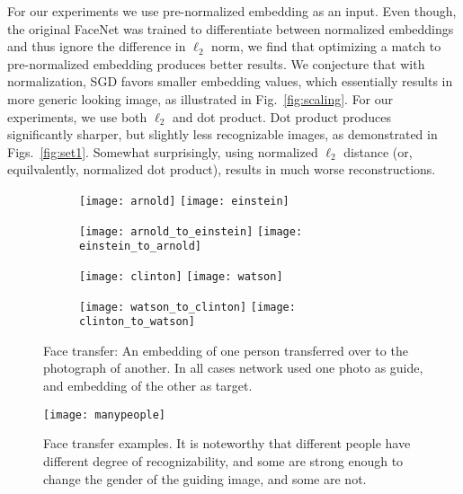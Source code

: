 \documentclass{article}
\newcommand{\Fig}[1]{Fig.~\ref{#1}}
\newcommand{\Figs}[1]{Figs.~\ref{#1}}
\begin{document}
  For our experiments we use pre-normalized embedding as an input. Even though, the original FaceNet was trained to differentiate between normalized embeddings and thus ignore
  the difference in $\ell_2$ norm, we find that optimizing a match to pre-normalized embedding produces better results. We conjecture that with normalization, SGD favors smaller embedding values, which
  essentially results in more generic looking image, as illustrated in \Fig{fig:scaling}.
  For our experiments, we use both $\ell_2$ and dot product. Dot product produces significantly sharper, but slightly less
  recognizable images, as demonstrated in \Figs{fig:set1}. Somewhat surprisingly, using normalized $\ell_2$ distance (or, equilvalently, normalized dot product),
  results in much worse reconstructions.
  \begin{figure}
  \centering
  \captionsetup[subfigure]{labelformat=parens}
    \begin{subfigure}{.16\textwidth}
        \centering
        \texttt{[image: arnold]}
        \texttt{[image: einstein]}
        \caption{}
    \end{subfigure}
    \begin{subfigure}{.16\textwidth}
      \centering
        \texttt{[image: arnold\_to\_einstein]}
        \texttt{[image: einstein\_to\_arnold]}
      \caption{}
      \label{fig:arn_x_ein}
   \end{subfigure}
   \begin{subfigure}{.16\textwidth}
        \centering
        \texttt{[image: clinton]}
        \texttt{[image: watson]}
        \caption{}
    \end{subfigure}
    \begin{subfigure}{.16\textwidth}
      \centering
        \texttt{[image: watson\_to\_clinton]}
        \texttt{[image: clinton\_to\_watson]}
      \caption{}
      \label{fig:watson_x_clinton}
   \end{subfigure}
  \caption{Face transfer: An embedding of one person transferred over to the photograph of another. In all cases network used one photo as guide, and embedding of the other as target.}
  \end{figure}

  \begin{figure}
  \centering
    \texttt{[image: manypeople]}
    \caption{Face transfer examples. It is noteworthy that different people have different degree of recognizability, and some are strong enough to change the
    gender of the guiding image, and some are not.}
    \label{fig:manypeople}
  \end{figure}
\end{document}
